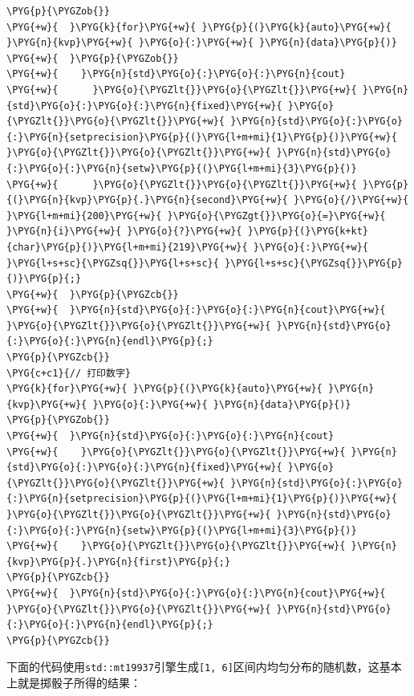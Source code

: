 \begin{codeblockbg}
\begin{Verbatim}[commandchars=\\\{\},breaklines=true,breakanywhere=true,fontsize=\codefont,xleftmargin=17bp]
\PYG{p}{\PYGZob{}}
\PYG{+w}{  }\PYG{k}{for}\PYG{+w}{ }\PYG{p}{(}\PYG{k}{auto}\PYG{+w}{ }\PYG{n}{kvp}\PYG{+w}{ }\PYG{o}{:}\PYG{+w}{ }\PYG{n}{data}\PYG{p}{)}
\PYG{+w}{  }\PYG{p}{\PYGZob{}}
\PYG{+w}{    }\PYG{n}{std}\PYG{o}{:}\PYG{o}{:}\PYG{n}{cout}
\PYG{+w}{      }\PYG{o}{\PYGZlt{}}\PYG{o}{\PYGZlt{}}\PYG{+w}{ }\PYG{n}{std}\PYG{o}{:}\PYG{o}{:}\PYG{n}{fixed}\PYG{+w}{ }\PYG{o}{\PYGZlt{}}\PYG{o}{\PYGZlt{}}\PYG{+w}{ }\PYG{n}{std}\PYG{o}{:}\PYG{o}{:}\PYG{n}{setprecision}\PYG{p}{(}\PYG{l+m+mi}{1}\PYG{p}{)}\PYG{+w}{ }\PYG{o}{\PYGZlt{}}\PYG{o}{\PYGZlt{}}\PYG{+w}{ }\PYG{n}{std}\PYG{o}{:}\PYG{o}{:}\PYG{n}{setw}\PYG{p}{(}\PYG{l+m+mi}{3}\PYG{p}{)}
\PYG{+w}{      }\PYG{o}{\PYGZlt{}}\PYG{o}{\PYGZlt{}}\PYG{+w}{ }\PYG{p}{(}\PYG{n}{kvp}\PYG{p}{.}\PYG{n}{second}\PYG{+w}{ }\PYG{o}{/}\PYG{+w}{ }\PYG{l+m+mi}{200}\PYG{+w}{ }\PYG{o}{\PYGZgt{}}\PYG{o}{=}\PYG{+w}{ }\PYG{n}{i}\PYG{+w}{ }\PYG{o}{?}\PYG{+w}{ }\PYG{p}{(}\PYG{k+kt}{char}\PYG{p}{)}\PYG{l+m+mi}{219}\PYG{+w}{ }\PYG{o}{:}\PYG{+w}{ }\PYG{l+s+sc}{\PYGZsq{}}\PYG{l+s+sc}{ }\PYG{l+s+sc}{\PYGZsq{}}\PYG{p}{)}\PYG{p}{;}
\PYG{+w}{  }\PYG{p}{\PYGZcb{}}
\PYG{+w}{  }\PYG{n}{std}\PYG{o}{:}\PYG{o}{:}\PYG{n}{cout}\PYG{+w}{ }\PYG{o}{\PYGZlt{}}\PYG{o}{\PYGZlt{}}\PYG{+w}{ }\PYG{n}{std}\PYG{o}{:}\PYG{o}{:}\PYG{n}{endl}\PYG{p}{;}
\PYG{p}{\PYGZcb{}}
\PYG{c+c1}{// 打印数字}
\PYG{k}{for}\PYG{+w}{ }\PYG{p}{(}\PYG{k}{auto}\PYG{+w}{ }\PYG{n}{kvp}\PYG{+w}{ }\PYG{o}{:}\PYG{+w}{ }\PYG{n}{data}\PYG{p}{)}
\PYG{p}{\PYGZob{}}
\PYG{+w}{  }\PYG{n}{std}\PYG{o}{:}\PYG{o}{:}\PYG{n}{cout}
\PYG{+w}{    }\PYG{o}{\PYGZlt{}}\PYG{o}{\PYGZlt{}}\PYG{+w}{ }\PYG{n}{std}\PYG{o}{:}\PYG{o}{:}\PYG{n}{fixed}\PYG{+w}{ }\PYG{o}{\PYGZlt{}}\PYG{o}{\PYGZlt{}}\PYG{+w}{ }\PYG{n}{std}\PYG{o}{:}\PYG{o}{:}\PYG{n}{setprecision}\PYG{p}{(}\PYG{l+m+mi}{1}\PYG{p}{)}\PYG{+w}{ }\PYG{o}{\PYGZlt{}}\PYG{o}{\PYGZlt{}}\PYG{+w}{ }\PYG{n}{std}\PYG{o}{:}\PYG{o}{:}\PYG{n}{setw}\PYG{p}{(}\PYG{l+m+mi}{3}\PYG{p}{)}
\PYG{+w}{    }\PYG{o}{\PYGZlt{}}\PYG{o}{\PYGZlt{}}\PYG{+w}{ }\PYG{n}{kvp}\PYG{p}{.}\PYG{n}{first}\PYG{p}{;}
\PYG{p}{\PYGZcb{}}
\PYG{+w}{  }\PYG{n}{std}\PYG{o}{:}\PYG{o}{:}\PYG{n}{cout}\PYG{+w}{ }\PYG{o}{\PYGZlt{}}\PYG{o}{\PYGZlt{}}\PYG{+w}{ }\PYG{n}{std}\PYG{o}{:}\PYG{o}{:}\PYG{n}{endl}\PYG{p}{;}
\PYG{p}{\PYGZcb{}}
\end{Verbatim}
\end{codeblockbg}



下面的代码使用\texttt{std::\allowbreak{}mt19937}引擎生成\texttt{[1, 6]}区间内均匀分布的随机数，这基本上就是掷骰子所得的结果：



